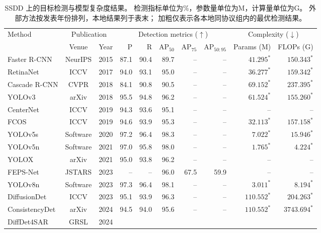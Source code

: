 \begin{table}[!t]
\centering
\scriptsize
\setlength{\tabcolsep}{3pt}
\renewcommand{\arraystretch}{1.10}
\caption{SSDD 上的目标检测与模型复杂度结果。
检测指标单位为\%，参数量单位为M，计算量单位为G。
外部方法按发表年份排列，本地结果列于表末；
加粗仅表示各本地同协议组内的最优检测结果。}
\label{tab:ssdd_detection_comparison}
\begin{tabular*}{\textwidth}{@{\extracolsep{\fill}}lccrrrrrrr}
\toprule
\multirow{2}{*}{Method}
& \multicolumn{2}{c}{Publication}
& \multicolumn{5}{c}{Detection metrics ($\uparrow$)}
& \multicolumn{2}{c}{Complexity ($\downarrow$)} \\
\cmidrule(lr){2-3}\cmidrule(lr){4-8}\cmidrule(lr){9-10}
& Venue & Year & P & R
& AP$_{50}$ & AP$_{75}$ & AP$_{50:95}$
& Params (M) & FLOPs (G) \\
\midrule
Faster R-CNN
& NeurIPS & 2015
& 87.1 & 90.4 & 89.7 & -- & --
& $41.295^{*}$ & $150.343^{*}$ \\
RetinaNet
& ICCV & 2017
& 94.0 & 93.1 & 95.0 & -- & --
& $36.277^{*}$ & $159.342^{*}$ \\
Cascade R-CNN
& CVPR & 2018
& 84.1 & 90.8 & 90.5 & -- & --
& $69.152^{*}$ & $237.395^{*}$ \\
YOLOv3
& arXiv & 2018
& 95.5 & 94.8 & 96.2 & -- & --
& $61.524^{*}$ & $155.260^{*}$ \\
CenterNet
& ICCV & 2019
& 94.3 & 93.6 & 95.1 & -- & --
& -- & -- \\
FCOS
& ICCV & 2019
& 94.6 & 93.9 & 95.3 & -- & --
& $32.113^{*}$ & $157.158^{*}$ \\
YOLOv5s
& Software & 2020
& 97.2 & 96.4 & 98.3 & -- & --
& $7.022^{*}$ & $15.946^{*}$ \\
YOLOv5n
& Software & 2021
& 97.0 & 95.8 & 98.0 & -- & --
& $1.765^{*}$ & $4.224^{*}$ \\
YOLOX
& arXiv & 2021
& 95.0 & 93.8 & 96.2 & -- & --
& -- & -- \\
FEPS-Net~\cite{feps2023}
& JSTARS & 2023
& -- & -- & 96.0 & 67.5 & 59.9
& -- & -- \\
YOLOv8n~\cite{yolov82023}
& Software & 2023
& 97.3 & 96.4 & 98.1 & -- & --
& $3.011^{*}$ & $8.194^{*}$ \\
DiffusionDet~\cite{diffusiondet2023}
& ICCV & 2023
& 95.1 & 93.9 & 96.3 & -- & --
& $110.552^{*}$ & $204.263^{*}$ \\
ConsistencyDet
& arXiv & 2024
& 94.5 & 94.0 & 95.6 & -- & --
& $110.552^{*}$ & $3743.694^{*}$ \\
DiffDet4SAR~\cite{diffdet4sar2024}
& GRSL & 2024

\end{tabular*}
\end{table}
